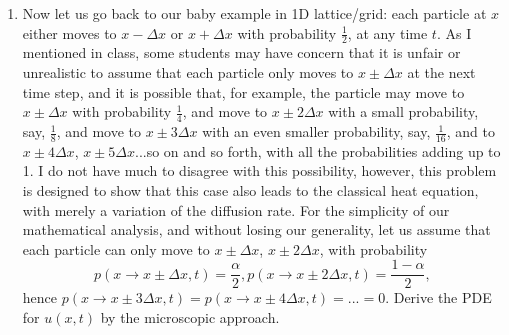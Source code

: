 \documentclass[6pt]{article}
\numberwithin{equation}{section}
\begin{document}
\begin{enumerate}
(iii) now let us go back to the same problem with $\Delta x=\Delta t=1$ and the same initial condition $u(x,0)=(4-x^2)^+$ but now over the finite interval $(-5,5)$.  We are well set for $u(x,1)$ at all $x$ except $x=\pm 5$, because $x=\pm6$ is not considered in this finite interval.  Therefore, we need to set specific conditions for $u(\pm5,t)$ for any time $t$ in order to calculate $u(\pm4,t+1)$, so on and so forth.  This condition is called the boundary condition and it must be set for any PDE over a finite interval.  One of the types is the so-called Dirichlet boundary condition (you have seen this already) and we set that $u(\pm5,t)=0$ (or some other constant) for any $t>0$.  Suppose that $u(\pm5,t)=0$ for any $t\geq0$.  plot $u(x,t)$ for $x=\pm5,...,\pm1,0$ at time $t=0,1,...,6$, and connect the neighbouring dots with straight lines;

(iv)  do the same as in (iii) with $u(\pm 5,t)=2$ for any $t>0$;

(v)  do the same as in (iii) with $u(-5,t)=1$ and $u(5,t)=3$ for any $t>0$.  Now you can see that different boundary conditions can have different effects on the solution's behavior;

(vi)  do the same as in (iii) with $u(-5,t)=1$ and $u(5,t)=3$ for any $t>0$, but $u_0(x)=(x^2-4)^+$.  Now you can see that different initial conditions can have different effects on the solution's behavior;

\textbf{Note}: you can always, for your entertainment but no need to show me, choose $\Delta x$ and $\Delta t$ to another size, say $10^{-3}$, to see how the discrete solution approaches the continuum solution;

\item Now let us go back to our baby example in 1D lattice/grid: each particle at $x$ either moves to $x-\Delta x$ or $x+\Delta x$ with probability $\frac{1}{2}$, at any time $t$.  As I mentioned in class, some students may have concern that it is unfair or unrealistic to assume that each particle only moves to $x\pm \Delta x$ at the next time step, and it is possible that, for example, the particle may move to $x\pm\Delta x$ with probability $\frac{1}{4}$, and move to $x\pm2\Delta x$ with a small probability, say, $\frac{1}{8}$, and move to $x\pm3\Delta x$ with an even smaller probability, say, $\frac{1}{16}$, and to $x\pm 4\Delta x$, $x\pm 5\Delta x$...so on and so forth, with all the probabilities adding up to 1.  I do not have much to disagree with this possibility, however, this problem is designed to show that this case also leads to the classical heat equation, with merely a variation of the diffusion rate.  For the simplicity of our mathematical analysis, and without losing our generality, let us assume that each particle can only move to $x\pm\Delta x$, $x\pm 2\Delta x$, with probability
\[p(x\rightarrow x\pm\Delta x,t)=\frac{\alpha}{2}, p(x\rightarrow x\pm2\Delta x,t)=\frac{1-\alpha}{2},\]
hence $p(x\rightarrow x\pm3\Delta x,t)=p(x\rightarrow x\pm4\Delta x,t)=...=0$.   Derive the PDE for $u(x,t)$ by the microscopic approach.


\end{enumerate}
\end{document}
